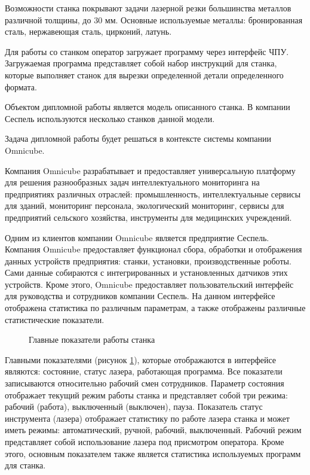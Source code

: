 Возможности станка покрывают задачи лазерной резки большинства металлов различной толщины, до 30 мм.
Основные используемые металлы: бронированная сталь, нержавеющая сталь, цирконий, латунь.

Для работы со станком оператор загружает программу через интерфейс ЧПУ.
Загружаемая программа представляет собой набор инструкций для станка,
которые выполняет станок для вырезки определенной детали определенного формата.

Объектом дипломной работы является модель описанного станка.
В компании Сеспель используются несколько станков данной модели.

Задача дипломной работы будет решаться в контексте
системы компании Omnicube.

Компания Omnicube разрабатывает и предоставляет универсальную платформу
для решения разнообразных задач интеллектуального мониторинга
на предприятиях различных отраслей: промышленность,
интеллектуальные сервисы для зданий, мониторинг персонала,
экологический мониторинг, сервисы для предприятий сельского хозяйства,
инструменты для медицинских учреждений. \cite{omnicube}

Одним из клиентов компании Omnicube является предприятие Сеспель.
Компания Omnicube предоставляет функционал сбора, обработки и отображения
данных устройств предприятия: станки, установки, производственные роботы. 
Сами данные собираются с интегрированных и установленных датчиков этих устройств.
Кроме этого, Omnicube предоставляет
пользовательский интерфейс для руководства и сотрудников компании Сеспель.
На данном интерфейсе отображена статистика по различным параметрам,
а также отображены различные статистические показатели.

\begin{figure}[ht!]
    \caption{Главные показатели работы станка}
    \label{main}
\end{figure}

Главными показателями (рисунок \ref{main}), которые отображаются в интерфейсе являются:
состояние, статус лазера, работающая программа.
Все показатели записываются относительно рабочий смен сотрудников.
Параметр состояния отображает текущий режим работы станка
и представляет собой три режима: рабочий (работа),
выключенный (выключен), пауза.
Показатель статус инструмента (лазера) отображает
статистику по работе лазера станка и может иметь режимы:
автоматический, ручной, рабочий, выключенный.
Рабочий режим представляет собой использование лазера под присмотром оператора.
Кроме этого, основным показателем также является статистика используемых программ для станка.

